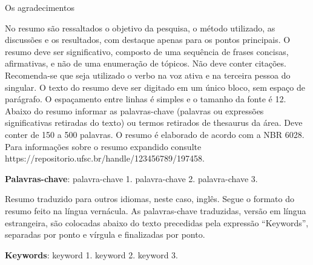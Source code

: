 \documentclass[
  12pt,        %
  oneside,      %
  a4paper,      %
  chapter=TITLE,    %
  section=TITLE,    %
  brazil,       %
  english,      %
]{abntex2}
\newcommand\blankpage{%
  \null
  \thispagestyle{empty}%
  \addtocounter{page}{-1}%
\newpage}
\theoremstyle{definition}
\begin{document}
\begin{agradecimentos}
  Os agradecimentos
\end{agradecimentos}

\afterpage{\blankpage}



\begin{resumo}
  No resumo são ressaltados o objetivo da pesquisa, o método utilizado, as discussões e os resultados, com destaque apenas para os pontos principais. O resumo deve ser significativo, composto de uma sequência de frases concisas, afirmativas, e não de uma enumeração de tópicos. Não deve conter citações. Recomenda-se que seja utilizado o verbo na voz ativa e na terceira pessoa do singular. O texto do resumo deve ser digitado em um único bloco, sem espaço de parágrafo. O espaçamento entre linhas é simples e o tamanho da fonte é 12. Abaixo do resumo informar as palavras-chave (palavras ou expressões significativas retiradas do texto) ou termos retirados de thesaurus da área. Deve conter de 150 a 500 palavras. O resumo é elaborado de acordo com a NBR 6028. Para informações sobre o resumo expandido consulte https://repositorio.ufsc.br/handle/123456789/197458.

  \vspace{\onelineskip}

  \noindent
  \textbf{Palavras-chave}: palavra-chave 1. palavra-chave 2. palavra-chave 3.
\end{resumo}

\begin{resumo}
  Resumo traduzido para outros idiomas, neste caso, inglês. Segue o formato do resumo feito na língua vernácula. As palavras-chave traduzidas, versão em língua estrangeira, são colocadas abaixo do texto precedidas pela expressão “Keywords”, separadas por ponto e vírgula e finalizadas por ponto.

  \vspace{\onelineskip}

  \noindent
  \textbf{Keywords}: keyword 1. keyword 2. keyword 3.
\end{resumo}

\tableofcontents*
\cleardoublepage

\textual
\end{document}
